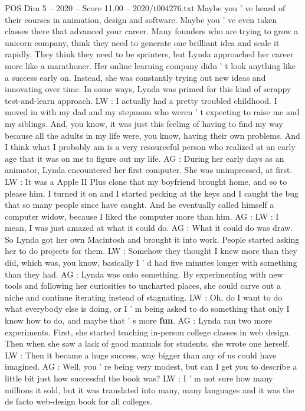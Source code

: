 \begin{textsample}{POS Dim 5 – 2020 – Score 11.00 – 2020/t004276.txt}
Maybe you ' ve heard of their courses in animation, design and software.
Maybe you ' ve even taken classes there that advanced your career.
Many founders who are trying to grow a unicorn company, think they need to generate one brilliant idea and scale it rapidly.
They think they need to be sprinters, but Lynda approached her career more like a marathoner.
Her online learning company didn ' t look anything like a success early on.
Instead, she was constantly trying out new ideas and innovating over time.
In some ways, Lynda was primed for this kind of scrappy test-and-learn approach.
LW : I actually had a pretty troubled childhood.
I moved in with my dad and my stepmom who weren ' t expecting to raise me and my siblings.
And, you know, it was just this feeling of having to find my way because all the adults in my life were, you know, having their own problems.
And I think what I probably am is a very resourceful person who realized at an early age that it was on me to figure out my life.
AG : During her early days as an animator, Lynda encountered her first computer.
She was unimpressed, at first.
LW : It was a Apple II Plus clone that my boyfriend brought home, and so to please him, I turned it on and I started pecking at the keys and I caught the bug that so many people since have caught.
And he eventually called himself a computer widow, because I liked the computer more than him.
AG : LW : I mean, I was just amazed at what it could do.
AG : What it could do was draw.
So Lynda got her own Macintosh and brought it into work.
People started asking her to do projects for them.
LW : Somehow they thought I knew more than they did, which was, you know, basically I ' d had five minutes longer with something than they had.
AG : Lynda was onto something.
By experimenting with new tools and following her curiosities to uncharted places, she could carve out a niche and continue iterating instead of stagnating.
LW : Oh, do I want to do what everybody else is doing, or I ' m being asked to do something that only I know how to do, and maybe that ' s more \textbf{fun}.
AG : Lynda ran two more experiments.
First, she started teaching in-person college classes in web design.
Then when she saw a lack of good manuals for students, she wrote one herself.
LW : Then it became a huge success, way bigger than any of us could have imagined.
AG : Well, you ' re being very modest, but can I get you to describe a little bit just how successful the book was?
LW : I ' m not sure how many millions it sold, but it was translated into many, many languages and it was the de facto web-design book for all colleges.

\end{textsample}
